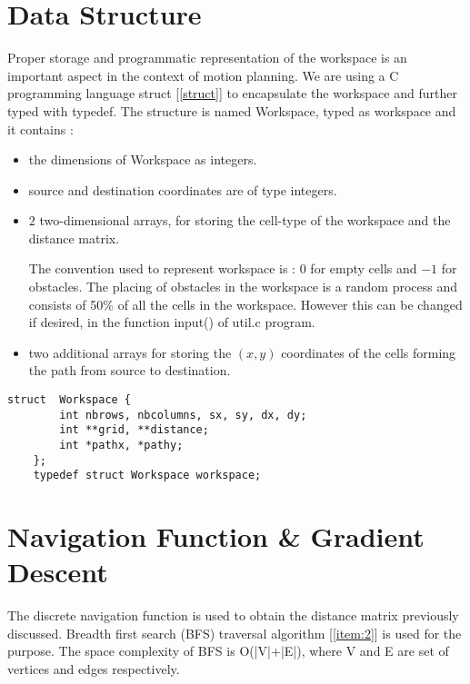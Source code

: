 \documentclass[12pt]{article}
\begin{document}
\section{Data Structure}
	Proper storage and programmatic representation of the workspace is
  an important aspect in the context of motion planning. We are using
  a \textsf{C} programming language \textsf{struct} [\autoref{struct}] to encapsulate the
  workspace and further typed with \textsf{typedef}. The structure
  is named \textsf{Workspace}, typed as \textsf{workspace} and it
  contains :	
	\begin{itemize}
	\item the dimensions of Workspace as \textsf{integers}.
	\item source and destination coordinates are of type \textsf{integers}.
	\item $2$ two-dimensional \textsf{arrays}, for storing the cell-type of the workspace and the distance matrix.
    
	The convention used to represent workspace is : $0$ for empty
  cells and $-1$ for obstacles. The placing
  of obstacles in the workspace is a random process and consists
  {of 50\% of all the cells} in the
  workspace. However this can be changed if desired, in the function \textsf{input()} of \textsf{util.c} program.

	\item two additional \textsf{arrays} for storing the $(x, y)$
    coordinates of the cells forming the path from source to
    destination. \\
	\end{itemize}
  
  
  \lstset{                                    %
  language=C,
  frame=lines,
  captionpos=b
 }


\renewcommand{\lstlistingname}{Code}
	
	\begin{lstlisting}[caption=Workspace struct, label=struct]
	struct  Workspace {
		int nbrows, nbcolumns, sx, sy, dx, dy;
		int **grid, **distance;
		int *pathx, *pathy;
	};
	typedef struct Workspace workspace;
	\end{lstlisting}
	

\section{Navigation Function \& Gradient Descent}
	The discrete navigation function is used to obtain the distance matrix previously discussed. Breadth first search (BFS) traversal
  algorithm [\ref{item:2}] is used for the purpose. {The space complexity of BFS is
    \textsf{O(|V|+|E|)},} where V and E are set of vertices and edges respectively. 
\end{document}
